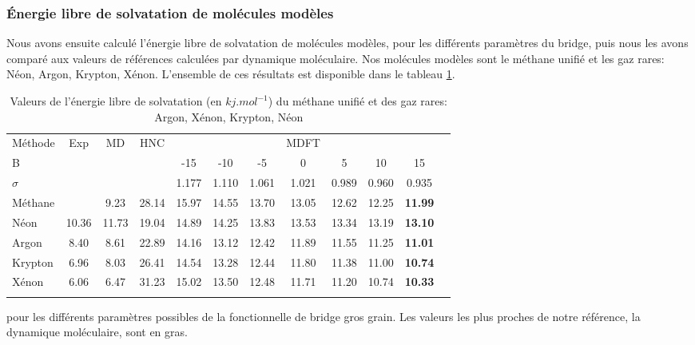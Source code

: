  



\subsubsection{\'Energie libre de solvatation de molécules modèles}
Nous avons ensuite calculé l'énergie libre de solvatation de molécules modèles, pour les différents paramètres du bridge, puis nous les avons comparé aux valeurs de références calculées par dynamique moléculaire. Nos molécules modèles sont le méthane unifié et les gaz rares: Néon, Argon, Krypton, Xénon. L'ensemble de ces résultats est disponible dans le tableau \ref{tab:energie_libre_molecules_models}. 



\begin{table}[H]
  \centering
  \begin{tabular}{ l c c c c c c c c c c c }
   \hline & \\[-1em]\hline
    Méthode    & Exp   & MD    & HNC    &      &       &       & MDFT  &       &       & \\
    \hline
    B          &       &       &        & -15   & -10   & -5    & 0     & 5     & 10    & 15     \\
    $\sigma$   &       &       &        & 1.177 & 1.110 & 1.061 & 1.021 & 0.989 & 0.960 & 0.935  \\
    \hline
    Méthane    &       &  9.23 & 28.14  & 15.97 & 14.55 & 13.70 & 13.05 & 12.62 & 12.25 & \textbf{11.99}  \\
    Néon       & 10.36 & 11.73 & 19.04  & 14.89 & 14.25 & 13.83 & 13.53 & 13.34 & 13.19 & \textbf{13.10}  \\
    Argon      &  8.40 &  8.61 & 22.89  & 14.16 & 13.12 & 12.42 & 11.89 & 11.55 & 11.25 & \textbf{11.01}  \\
    Krypton    &  6.96 &  8.03 & 26.41  & 14.54 & 13.28 & 12.44 & 11.80 & 11.38 & 11.00 & \textbf{10.74}  \\
    Xénon       &  6.06 &  6.47 & 31.23 & 15.02 & 13.50 & 12.48 & 11.71 & 11.20 & 10.74 & \textbf{10.33}  \\
    \hline & \\[-1em]\hline
  \end{tabular}
  \caption[\`Energie libre de solvatation du méthane unifié et des gaz rares.]{Valeurs de l'énergie libre de solvatation (en $kj.mol^{-1}$) du méthane unifié et des gaz rares: Argon, Xénon, Krypton, Néon}{ pour les différents paramètres possibles de la fonctionnelle de bridge gros grain. Les valeurs les plus proches de notre référence, la dynamique moléculaire, sont en gras.}
  \label{tab:energie_libre_molecules_models}  
\end{table}

